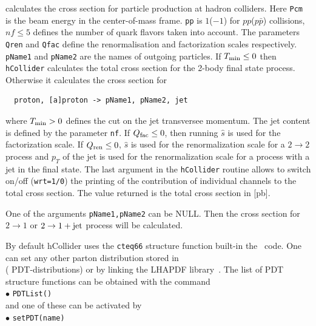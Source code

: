 \documentclass[12pt,a4paper]{article}
\begin{document}
calculates the cross
section for particle production at hadron colliders. Here \verb|Pcm| 
is the beam energy  in the center-of-mass frame. \verb|pp| is
$1$($-1$) for $pp$($p\bar{p}$) collisions, $ nf \le 5$  defines the
number of quark flavors taken into account.
The parameters  {\tt Qren} and  {\tt Qfac} define the renormalisation and factorization
 scales respectively. {\tt pName1} and {\tt pName2} are the names of outgoing
particles. If $T_{\rm min} \le 0 $ then {\tt hCollider} calculates the total  
cross section for the 2-body final state  process. Otherwise it calculates the cross
section for
\begin{verbatim}
  proton, [a]proton -> pName1, pName2, jet
\end{verbatim} 
where $ T_{\rm min}>0 $  defines the cut on the  jet transversee momentum. 
The jet content is defined by the  parameter \verb|nf|. 
If $Q_{\rm fac} \le 0 $, then  running  $\hat{s}$ is used for the
factorization  scale. If  $Q_{\rm ren} \le 0 $,  
$\hat{s}$ is used for the renormalization scale for a $2\to2$ process and $p_{T}$ of the jet is used for the renormalization scale for a process with a jet in the final state.
The last argument in the  {\tt hCollider} routine allows to switch
on/off ({\tt wrt=1/0}) the printing  of the contribution of individual channels to the total
cross section.   The value returned  is the total  cross section in [pb]. 


One of the arguments \verb|pName1,pName2| can be NULL. Then the cross section for $2\to1$   or $2\to1 + {\rm jet}$
process will be calculated. 

By default hCollider uses the 
\verb|cteq66| \cite{Nadolsky:2008zw}
structure function built-in
the \micro\ code. One can set any other parton distribution stored  in\\
   ( PDT-distributions) or by linking the  LHAPDF library~\cite{Buckley:2014ana}.  The list  of  PDT  structure functions  can be
obtained with the command \\
$\bullet$ \verb|PDTList()| \\
and one of these can be activated by\\ 
$\bullet$ \verb|setPDT(name)|\\
\end{document}
